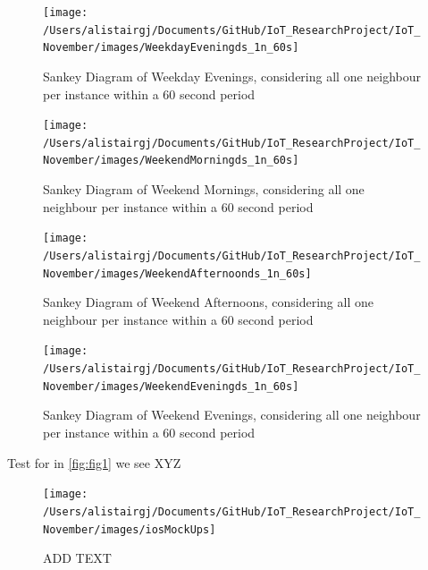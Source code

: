 \documentclass[11pt,]{article}
\begin{document}
\begin{figure}[H]

{\centering \texttt{[image: /Users/alistairgj/Documents/GitHub/IoT\_ResearchProject/IoT\_November/images/WeekdayEveningds\_1n\_60s]} 

}

\caption{Sankey Diagram of Weekday Evenings, considering all one neighbour per instance within a 60 second period}\label{fig:sankey_WeekdayEveningds_1n_60s}
\end{figure}

\begin{figure}[H]

{\centering \texttt{[image: /Users/alistairgj/Documents/GitHub/IoT\_ResearchProject/IoT\_November/images/WeekendMorningds\_1n\_60s]} 

}

\caption{Sankey Diagram of Weekend Mornings, considering all one neighbour per instance within a 60 second period}\label{fig:sankey_WeekendMorningds_1n_60s}
\end{figure}

\begin{figure}[H]

{\centering \texttt{[image: /Users/alistairgj/Documents/GitHub/IoT\_ResearchProject/IoT\_November/images/WeekendAfternoonds\_1n\_60s]} 

}

\caption{Sankey Diagram of Weekend Afternoons, considering all one neighbour per instance within a 60 second period}\label{fig:sankey_WeekendAfternoonds_1n_60s}
\end{figure}

\begin{figure}[H]

{\centering \texttt{[image: /Users/alistairgj/Documents/GitHub/IoT\_ResearchProject/IoT\_November/images/WeekendEveningds\_1n\_60s]} 

}

\caption{Sankey Diagram of Weekend Evenings, considering all one neighbour per instance within a 60 second period}\label{fig:sankey_WeekendEveningds_1n_60s}
\end{figure}

\pagebreak

Test for in \ref{fig:fig1} we see XYZ

\begin{figure}[H]

{\centering \texttt{[image: /Users/alistairgj/Documents/GitHub/IoT\_ResearchProject/IoT\_November/images/iosMockUps]} 

}

\caption{ADD TEXT}\label{fig:unnamed-chunk-12}
\end{figure}
\end{document}

